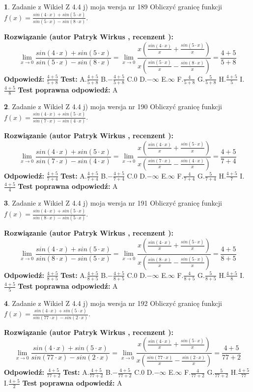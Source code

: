 \documentclass[12pt, a4paper]{article}
\theoremstyle{definition} %
\newtheorem{zad}{}
\newcommand{\zadStart}[1]{\begin{zad}#1\newline}
\newcommand{\zadStop}{\end{zad}}
\newcommand{\rozwStart}[2]{\noindent \textbf{Rozwiązanie (autor #1 , recenzent #2): }\newline}
\newcommand{\rozwStop}{\newline}
\newcommand{\odpStart}{\noindent \textbf{Odpowiedź:}\newline}
\newcommand{\odpStop}{\newline}
\newcommand{\testStart}{\noindent \textbf{Test:}\newline}
\newcommand{\testStop}{\newline}
\newcommand{\kluczStart}{\noindent \textbf{Test poprawna odpowiedź:}\newline}
\newcommand{\kluczStop}{\newline}
\begin{document}
\zadStart{Zadanie z Wikieł Z 4.4 j) moja wersja nr 189}
Obliczyć granicę funkcji $f(x)=\frac{sin(4\cdot x) +sin(5\cdot x)}{sin(5\cdot x) -sin(8\cdot x)}$.
\zadStop
\rozwStart{Patryk Wirkus}{}
$$\lim\limits_{x\to 0}\frac{sin(4\cdot x) +sin(5\cdot x)}{sin(5\cdot x) -sin(8\cdot x)}=\lim\limits_{x\to 0}\frac{x(\frac{sin(4\cdot x)}{x}+\frac{sin(5\cdot x)}{x})}{x(\frac{sin(5\cdot x)}{x}-\frac{sin(8\cdot x)}{x})}=\frac{4+5}{5+8}$$
\rozwStop
\odpStart
$\frac{4+5}{5+8}$
\odpStop
\testStart
A.$\frac{4+5}{5+8}$
B.$-\frac{4+5}{5+8}$
C.$0$
D.$-\infty$
E.$\infty$
F.$\frac{4}{5+8}$
G.$\frac{5}{5+8}$
H.$\frac{4+5}{5}$
I.$\frac{4+5}{8}$
\testStop
\kluczStart
A
\kluczStop



\zadStart{Zadanie z Wikieł Z 4.4 j) moja wersja nr 190}
Obliczyć granicę funkcji $f(x)=\frac{sin(4\cdot x) +sin(5\cdot x)}{sin(7\cdot x) -sin(4\cdot x)}$.
\zadStop
\rozwStart{Patryk Wirkus}{}
$$\lim\limits_{x\to 0}\frac{sin(4\cdot x) +sin(5\cdot x)}{sin(7\cdot x) -sin(4\cdot x)}=\lim\limits_{x\to 0}\frac{x(\frac{sin(4\cdot x)}{x}+\frac{sin(5\cdot x)}{x})}{x(\frac{sin(7\cdot x)}{x}-\frac{sin(4\cdot x)}{x})}=\frac{4+5}{7+4}$$
\rozwStop
\odpStart
$\frac{4+5}{7+4}$
\odpStop
\testStart
A.$\frac{4+5}{7+4}$
B.$-\frac{4+5}{7+4}$
C.$0$
D.$-\infty$
E.$\infty$
F.$\frac{4}{7+4}$
G.$\frac{5}{7+4}$
H.$\frac{4+5}{7}$
I.$\frac{4+5}{4}$
\testStop
\kluczStart
A
\kluczStop



\zadStart{Zadanie z Wikieł Z 4.4 j) moja wersja nr 191}
Obliczyć granicę funkcji $f(x)=\frac{sin(4\cdot x) +sin(5\cdot x)}{sin(8\cdot x) -sin(5\cdot x)}$.
\zadStop
\rozwStart{Patryk Wirkus}{}
$$\lim\limits_{x\to 0}\frac{sin(4\cdot x) +sin(5\cdot x)}{sin(8\cdot x) -sin(5\cdot x)}=\lim\limits_{x\to 0}\frac{x(\frac{sin(4\cdot x)}{x}+\frac{sin(5\cdot x)}{x})}{x(\frac{sin(8\cdot x)}{x}-\frac{sin(5\cdot x)}{x})}=\frac{4+5}{8+5}$$
\rozwStop
\odpStart
$\frac{4+5}{8+5}$
\odpStop
\testStart
A.$\frac{4+5}{8+5}$
B.$-\frac{4+5}{8+5}$
C.$0$
D.$-\infty$
E.$\infty$
F.$\frac{4}{8+5}$
G.$\frac{5}{8+5}$
H.$\frac{4+5}{8}$
I.$\frac{4+5}{5}$
\testStop
\kluczStart
A
\kluczStop



\zadStart{Zadanie z Wikieł Z 4.4 j) moja wersja nr 192}
Obliczyć granicę funkcji $f(x)=\frac{sin(4\cdot x) +sin(5\cdot x)}{sin(77\cdot x) -sin(2\cdot x)}$.
\zadStop
\rozwStart{Patryk Wirkus}{}
$$\lim\limits_{x\to 0}\frac{sin(4\cdot x) +sin(5\cdot x)}{sin(77\cdot x) -sin(2\cdot x)}=\lim\limits_{x\to 0}\frac{x(\frac{sin(4\cdot x)}{x}+\frac{sin(5\cdot x)}{x})}{x(\frac{sin(77\cdot x)}{x}-\frac{sin(2\cdot x)}{x})}=\frac{4+5}{77+2}$$
\rozwStop
\odpStart
$\frac{4+5}{77+2}$
\odpStop
\testStart
A.$\frac{4+5}{77+2}$
B.$-\frac{4+5}{77+2}$
C.$0$
D.$-\infty$
E.$\infty$
F.$\frac{4}{77+2}$
G.$\frac{5}{77+2}$
H.$\frac{4+5}{77}$
I.$\frac{4+5}{2}$
\testStop
\kluczStart
A
\kluczStop
\end{document}
